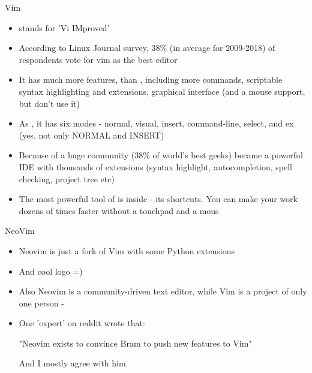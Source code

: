 \documentclass[usenames,dvipsnames,10pt,aspectratio=169]{beamer}
\begin{document}
\begin{frame}{Vim}
    \begin{itemize}
        \item {} stands for 'Vi IMproved'
        \item According to Linux Journal survey, 38\% (in average for 2009-2018) of respondents vote for vim as the best editor
        \item It has much more features, than , including more commands, scriptable syntax highlighting and extensions, graphical interface (and a mouse support, but don't use it)
        \item As , it has six modes - normal, visual, insert, command-line, select, and ex (yes, not only NORMAL and INSERT)
        \item Because of a huge community (38\% of world's best geeks)  became a powerful IDE with thousands of extensions (syntax highlight, autocompletion, spell checking, project tree etc)
        \item The most powerful tool of  is inside - its shortcuts. You can make your work dozens of times faster without a touchpad and a mous
    \end{itemize}
\end{frame}

\begin{frame}{NeoVim}
    \begin{itemize}
        \item Neovim is just a fork of Vim with some Python extensions 
        \item And cool logo =)
        \item Also Neovim is a community-driven text editor, while Vim is a project of only one person - 
        \item One 'expert' on reddit wrote that:
        
                \hspace*{1cm} "Neovim exists to convince Bram to push new features to Vim"
            
            And I mostly agree with him.
    \end{itemize}    
\end{frame}
\end{document}

